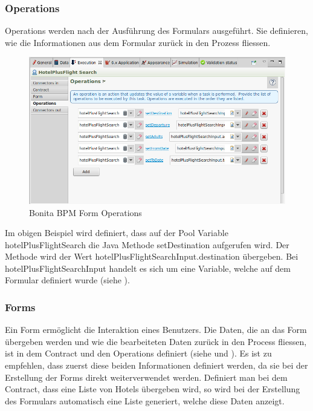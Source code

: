 \subsubsection{Operations}
\label{sec:analyse:bonita:forms:operations}
Operations werden nach der Ausführung des Formulars ausgeführt. Sie definieren, wie die Informationen aus dem Formular zurück in den Prozess fliessen.

\begin{figure}[H]
	\centering
	\includegraphics[width=1\textwidth]{images/bonita-operations.png}
	\caption{Bonita BPM Form Operations}
	\label{fig:analyse:bonita:forms:operations}
\end{figure}
Im obigen Beispiel wird definiert, dass auf der Pool Variable hotelPlusFlightSearch die Java Methode setDestination aufgerufen wird. Der Methode wird der Wert hotelPlusFlightSearchInput.destination übergeben. Bei hotelPlusFlightSearchInput handelt es sich um eine Variable, welche auf dem Formular definiert wurde (siehe ).

\subsubsection{Forms}
\label{sec:analyse:bonita:forms:forms}
Ein Form ermöglicht die Interaktion eines Benutzers. Die Daten, die an das Form übergeben werden und wie die bearbeiteten Daten zurück in den Process fliessen, ist in dem Contract und den Operations definiert (siehe  und  ). Es ist zu empfehlen, dass zuerst diese beiden Informationen definiert werden, da sie bei der Erstellung der Forms direkt weiterverwendet werden. Definiert man bei dem Contract, dass eine Liste von Hotels übergeben wird, so wird bei der Erstellung des Formulars automatisch eine Liste generiert, welche diese Daten anzeigt. 

